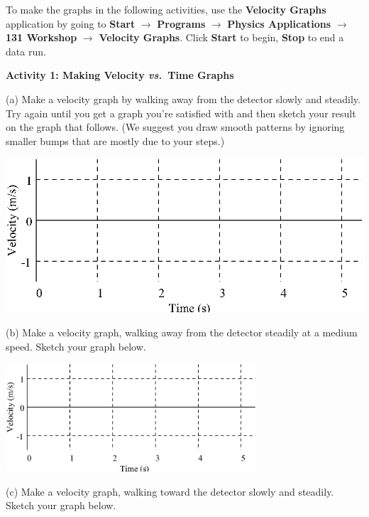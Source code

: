 To make the graphs in the following activities, use the \textbf{Velocity Graphs} application by going to \textbf{Start} $\rightarrow$ \textbf{Programs} $\rightarrow$ \textbf{Physics Applications} $\rightarrow$ \textbf{131 Workshop} $\rightarrow$ \textbf{Velocity Graphs}. Click \textbf{Start} to begin, \textbf{Stop} to end a data run.

\textbf{Activity 1: Making Velocity \textit{vs.}~Time Graphs} 

(a) Make a velocity graph by walking away from the detector slowly and steadily.
Try again until you get a graph you're satisfied with and then sketch your result
on the graph that follows. (We suggest you draw smooth patterns by ignoring
smaller bumps that are mostly due to your steps.)

\vspace{0.3cm}
{\par\centering \includegraphics{velocity/velocity_fig1.eps} \par}
\vspace{0.3cm}

(b) Make a velocity graph, walking away from the detector steadily at a medium
speed. Sketch your graph below.

\vspace{0.3cm}
{\par\centering \includegraphics[width=0.7\textwidth]{velocity/velocity_fig1.eps} \par}
\vspace{0.3cm}

(c) Make a velocity graph, walking toward the detector slowly and steadily.
Sketch your graph below.

